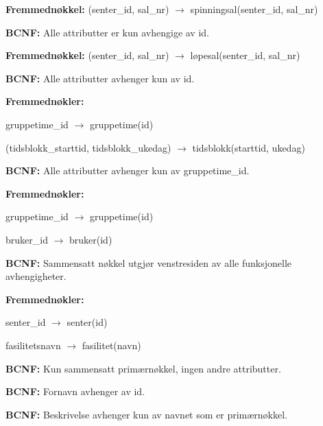 \vspace{0.8em}
\textbf{Fremmednøkkel:} (senter\_id, sal\_nr) $\rightarrow$ spinningsal(senter\_id, sal\_nr)\par
\vspace{0.15em}
\textbf{BCNF:} Alle attributter er kun avhengige av id.

\vspace{0.8em}
\textbf{Fremmednøkkel:} (senter\_id, sal\_nr) $\rightarrow$ løpesal(senter\_id, sal\_nr)\par
\vspace{0.15em}
\textbf{BCNF:} Alle attributter avhenger kun av id.

\vspace{0.8em}
\textbf{Fremmednøkler:}\par\vspace{-0.55em}
\begin{schemafks}
    \item gruppetime\_id $\rightarrow$ gruppetime(id)
    \item (tidsblokk\_starttid, tidsblokk\_ukedag) $\rightarrow$ tidsblokk(starttid, ukedag)
\end{schemafks}
\vspace{-0.2em}
\textbf{BCNF:} Alle attributter avhenger kun av gruppetime\_id.

\vspace{0.8em}
\textbf{Fremmednøkler:}\par\vspace{-0.55em}
\begin{schemafks}
    \item gruppetime\_id $\rightarrow$ gruppetime(id)
    \item bruker\_id $\rightarrow$ bruker(id)
\end{schemafks}
\vspace{-0.2em}
\textbf{BCNF:} Sammensatt nøkkel utgjør venstresiden av alle funksjonelle avhengigheter.

\vspace{0.8em}
\textbf{Fremmednøkler:}\par\vspace{-0.55em}
\begin{schemafks}
    \item senter\_id $\rightarrow$ senter(id)
    \item fasilitetsnavn $\rightarrow$ fasilitet(navn)
\end{schemafks}
\vspace{-0.2em}
\textbf{BCNF:} Kun sammensatt primærnøkkel, ingen andre attributter.

\vspace{0.8em}
\textbf{BCNF:} Fornavn avhenger av id.

\vspace{0.8em}
\textbf{BCNF:} Beskrivelse avhenger kun av navnet som er primærnøkkel.
